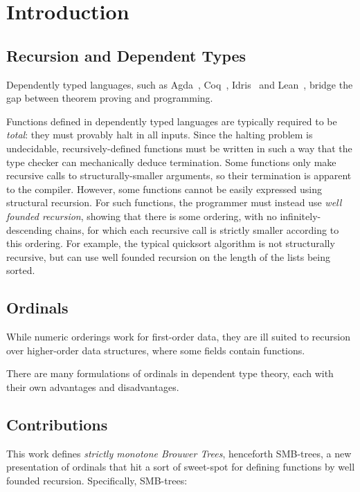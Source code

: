 \section{Introduction}

\subsection{Recursion and Dependent Types}
Dependently typed languages, such as Agda~\citep{TODO}, Coq~\citep{coqart},
Idris~\citep{TODO} and Lean~\citep{TODO}, bridge the gap between theorem
proving and programming.

Functions defined in dependently typed languages are typically required to be
\textit{total}: they must provably halt in all inputs. Since the halting problem
is undecidable, recursively-defined functions must be written in such a way that the type checker
can mechanically deduce termination.
Some functions only make recursive calls to structurally-smaller arguments,
so their termination is apparent to the compiler. However, some functions
cannot be easily expressed using structural recursion.
For such functions, the programmer must instead use \textit{well founded recursion}, showing that there is some ordering, with no infinitely-descending
chains, for which each recursive call is strictly smaller according to this ordering. For example, the typical quicksort algorithm is not structurally recursive, but can use well founded recursion on the length of the lists being sorted.

\subsection{Ordinals}

While numeric orderings work for first-order data, they are ill suited to recursion over
higher-order data structures, where some fields contain functions.

There are many formulations of ordinals in dependent type theory, each with their own advantages and disadvantages.


\subsection{Contributions}

This work defines \textit{strictly monotone Brouwer Trees}, henceforth SMB-trees,
a new presentation of ordinals that hit a sort of sweet-spot for defining functions by
well founded recursion. Specifically, SMB-trees:

